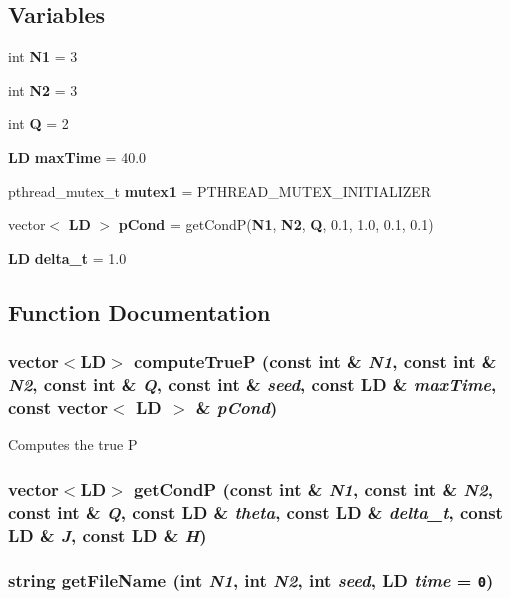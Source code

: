 \subsection*{Variables}
\begin{CompactItemize}
\item 
int {\bf N1} = 3
\item 
int {\bf N2} = 3
\item 
int {\bf Q} = 2
\item 
{\bf LD} {\bf maxTime} = 40.0
\item 
pthread\_\-mutex\_\-t {\bf mutex1} = PTHREAD\_\-MUTEX\_\-INITIALIZER
\item 
vector$<$ {\bf LD} $>$ {\bf pCond} = getCondP({\bf N1}, {\bf N2}, {\bf Q}, 0.1, 1.0, 0.1, 0.1)
\item 
{\bf LD} {\bf delta\_\-t} = 1.0
\end{CompactItemize}


\subsection{Function Documentation}
\subsubsection{\setlength{\rightskip}{0pt plus 5cm}vector$<${\bf LD}$>$ computeTrueP (const int \& {\em N1}, const int \& {\em N2}, const int \& {\em Q}, const int \& {\em seed}, const {\bf LD} \& {\em maxTime}, const vector$<$ {\bf LD} $>$ \& {\em pCond})}\label{Porig_8cpp_21fb5e6aeb14005961d006b4f43d73ca}


Computes the true P 
\subsubsection{\setlength{\rightskip}{0pt plus 5cm}vector$<${\bf LD}$>$ getCondP (const int \& {\em N1}, const int \& {\em N2}, const int \& {\em Q}, const {\bf LD} \& {\em theta}, const {\bf LD} \& {\em delta\_\-t}, const {\bf LD} \& {\em J}, const {\bf LD} \& {\em H})}\label{Porig_8cpp_5baab3b4d2d6c28621f1bc87e91768c9}


\subsubsection{\setlength{\rightskip}{0pt plus 5cm}string getFileName (int {\em N1}, int {\em N2}, int {\em seed}, {\bf LD} {\em time} = {\tt 0})}\label{Porig_8cpp_b6e9e8189ff28be11f3ece9480b3ae58}


